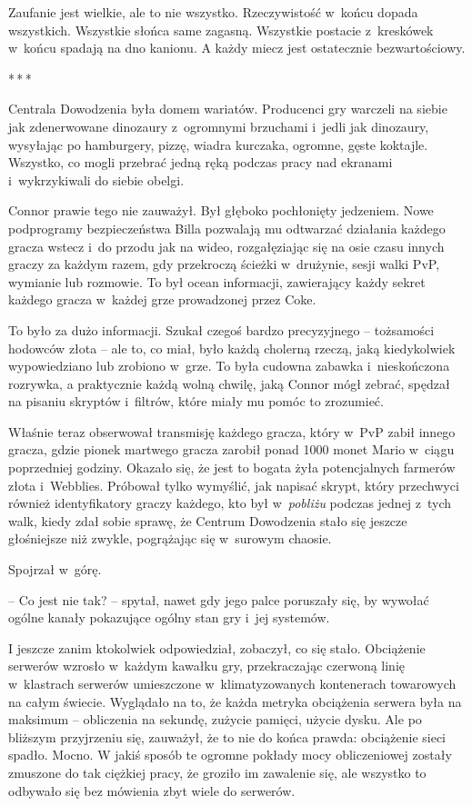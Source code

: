 \documentclass[oneside,polish,11pt,rmheadings]{mwbk}
\newcommand{\threeast}{\par\centerline{*\,*\,*}\medskip\par}
\begin{document}
Zaufanie jest wielkie, ale to nie wszystko. Rzeczywistość w~końcu dopada wszystkich. Wszystkie słońca same zagasną. Wszystkie postacie z~kreskówek w~końcu spadają na dno kanionu. A każdy miecz jest ostatecznie bezwartościowy.

\bigskip
\threeast

Centrala Dowodzenia była domem wariatów. Producenci gry warczeli na siebie jak zdenerwowane dinozaury z~ogromnymi brzuchami i~jedli jak dinozaury, wysyłając po hamburgery, pizzę, wiadra kurczaka, ogromne, gęste koktajle. Wszystko, co mogli przebrać jedną ręką podczas pracy nad ekranami i~wykrzykiwali do siebie obelgi.

Connor prawie tego nie zauważył. Był głęboko pochłonięty jedzeniem. Nowe podprogramy bezpieczeństwa Billa pozwalają mu odtwarzać działania każdego gracza wstecz i~do przodu jak na wideo, rozgałęziając się na osie czasu innych graczy za każdym razem, gdy przekroczą ścieżki w~drużynie, sesji walki PvP, wymianie lub rozmowie. To był ocean informacji, zawierający każdy sekret każdego gracza w~każdej grze prowadzonej przez Coke.

To było za dużo informacji. Szukał czegoś bardzo precyzyjnego -- tożsamości hodowców złota -- ale to, co miał, było każdą cholerną rzeczą, jaką kiedykolwiek wypowiedziano lub zrobiono w~grze. To była cudowna zabawka i~nieskończona rozrywka, a praktycznie każdą wolną chwilę, jaką Connor mógł zebrać, spędzał na pisaniu skryptów i~filtrów, które miały mu pomóc to zrozumieć.

Właśnie teraz obserwował transmisję każdego gracza, który w~PvP zabił innego gracza, gdzie pionek martwego gracza zarobił ponad 1000 monet Mario w~ciągu poprzedniej godziny. Okazało się, że jest to bogata żyła potencjalnych farmerów złota i~Webblies. Próbował tylko wymyślić, jak napisać skrypt, który przechwyci również identyfikatory graczy każdego, kto był w~\textit{pobliżu }podczas jednej z~tych walk, kiedy zdał sobie sprawę, że Centrum Dowodzenia stało się jeszcze głośniejsze niż zwykle, pogrążając się w~surowym chaosie.

Spojrzał w~górę. 

-- Co jest nie tak? -- spytał, nawet gdy jego palce poruszały się, by wywołać ogólne kanały pokazujące ogólny stan gry i~jej systemów. 

I jeszcze zanim ktokolwiek odpowiedział, zobaczył, co się stało. Obciążenie serwerów wzrosło w~każdym kawałku gry, przekraczając czerwoną linię w~klastrach serwerów umieszczone w~klimatyzowanych kontenerach towarowych na całym świecie. Wyglądało na to, że każda metryka obciążenia serwera była na maksimum -- obliczenia na sekundę, zużycie pamięci, użycie dysku. Ale po bliższym przyjrzeniu się, zauważył, że to nie do końca prawda: obciążenie sieci spadło. Mocno. W jakiś sposób te ogromne pokłady mocy obliczeniowej zostały zmuszone do tak ciężkiej pracy, że groziło im zawalenie się, ale wszystko to odbywało się bez mówienia zbyt wiele do serwerów.
\end{document}
